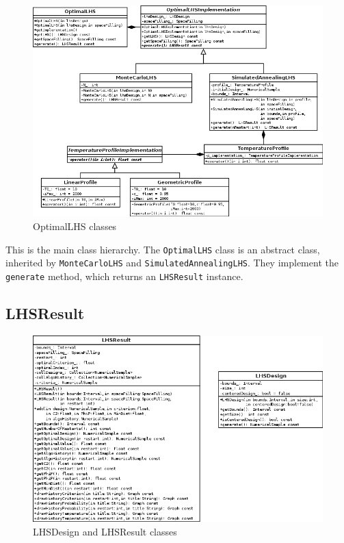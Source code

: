 \begin{figure}[htb]
  \begin{center}
    \includegraphics[scale=0.5]{OptimalLHS.png}
    \caption{OptimalLHS classes}\label{fig:archi:optimal-lhs}
  \end{center}
\end{figure}

This is the main class hierarchy.  The \texttt{OptimalLHS} class is an abstract class,
inherited by \texttt{MonteCarloLHS} and \texttt{SimulatedAnnealingLHS}.  They implement the
\texttt{generate} method, which returns an \texttt{LHSResult} instance.

\subsection{LHSResult}

\begin{figure}[htb]
  \begin{center}
    \includegraphics[scale=0.65]{LHSResult.png}
    \caption{LHSDesign and LHSResult classes}\label{fig:archi:lhs}
  \end{center}
\end{figure}

